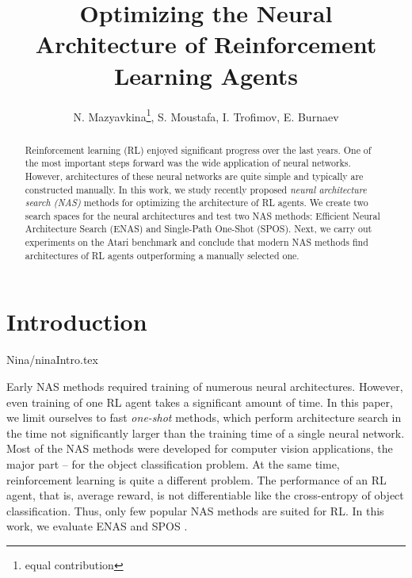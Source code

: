 \documentclass{svproc}
\begin{document}
\mainmatter              \title{Optimizing the Neural Architecture of Reinforcement Learning Agents}
  \author{N. Mazyavkina\thanks{equal contribution}, S. Moustafa\footnotemark[1], I. Trofimov, E. Burnaev}


\maketitle              

\begin{abstract}
Reinforcement learning (RL) enjoyed significant progress over the last years. One of the most important steps forward was the wide application of neural networks. However, architectures of these neural networks are quite simple and typically are constructed manually. In this work, we study recently proposed \textit{neural architecture search (NAS)} methods for optimizing the architecture of RL agents. We create two search spaces for the neural architectures and test two NAS methods: Efficient Neural Architecture Search (ENAS) and Single-Path One-Shot (SPOS). Next, we carry out experiments on the Atari benchmark and conclude that modern NAS methods find architectures of RL agents outperforming a manually selected one. 





\end{abstract}

\section{Introduction}
{Nina/ninaIntro.tex}

Early NAS methods \cite{zoph2016neural, zoph2018learning} required training of numerous neural architectures. However, even training of one RL agent takes a significant amount of time. 
In this paper, we limit ourselves to fast \textit{one-shot} methods, which perform architecture search in the time not significantly larger than the training time of a single neural network. 
Most of the NAS methods were developed for computer vision applications, the major part -- for the object classification problem. 
At the same time, reinforcement learning is quite a different problem. The performance of an RL agent, that is, average reward, is not differentiable like the cross-entropy of object classification. 
Thus, only few popular NAS methods are suited for RL. In this work, we evaluate ENAS \cite{zoph2018learning} and SPOS \cite{guo2019single}.
\end{document}
